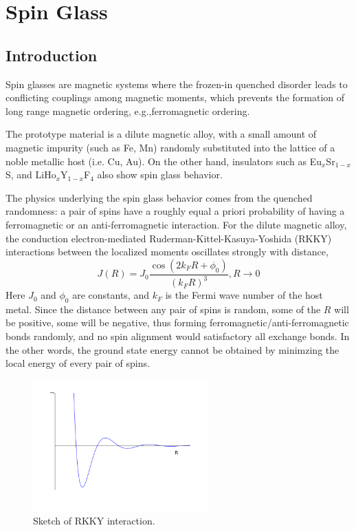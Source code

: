\chapter{Spin Glass}
\label{chap:SGintro}
\section{Introduction}
Spin glasses are magnetic systems where the frozen-in quenched  
disorder leads to conflicting couplings among magnetic moments, which prevents the formation 
of long range magnetic ordering, e.g.,ferromagnetic ordering.

The prototype material is a dilute magnetic alloy, with a small amount of 
magnetic impurity (such as Fe, Mn) randomly substituted into the lattice of a 
noble metallic host (i.e. Cu, Au). On the other hand, insulators such as 
Eu$_x$Sr$_{1-x}$S, and LiHo$_{x}$Y$_{1-x}$F$_{4}$ also show spin glass behavior.
 
The physics underlying the spin glass behavior comes from the quenched 
randomness: a pair of spins have a roughly equal a priori probability of having
a ferromagnetic or an anti-ferromagnetic interaction. For the dilute magnetic 
alloy, the conduction electron-mediated 
Ruderman-Kittel-Kasuya-Yoshida (RKKY) interactions between the localized moments
 oscillates strongly with distance, 
 \begin{equation}
   \label{eq:RKKY}
   J(R)=J_0\frac{\cos(2k_FR+\phi_0)}{(k_FR)^3}, R\rightarrow 0
 \end{equation}
Here $J_0$ and $\phi_0$ are constants, and $k_F$ is the Fermi wave number of the
host metal. Since the distance between any pair of spins is random, some of the $R$
will be positive, some will be negative,
thus forming ferromagnetic/anti-ferromagnetic bonds randomly, and no spin 
alignment would satisfactory all exchange bonds. In the other words, the 
ground state energy cannot be obtained by minimzing the local energy 
of every pair of spins.

\begin{figure}[!h]
  \label{fig:rkky}
  \centering
  \includegraphics[width=0.6\textwidth]{img/RKKY.png}
  \caption{Sketch of RKKY interaction.}
\end{figure}

